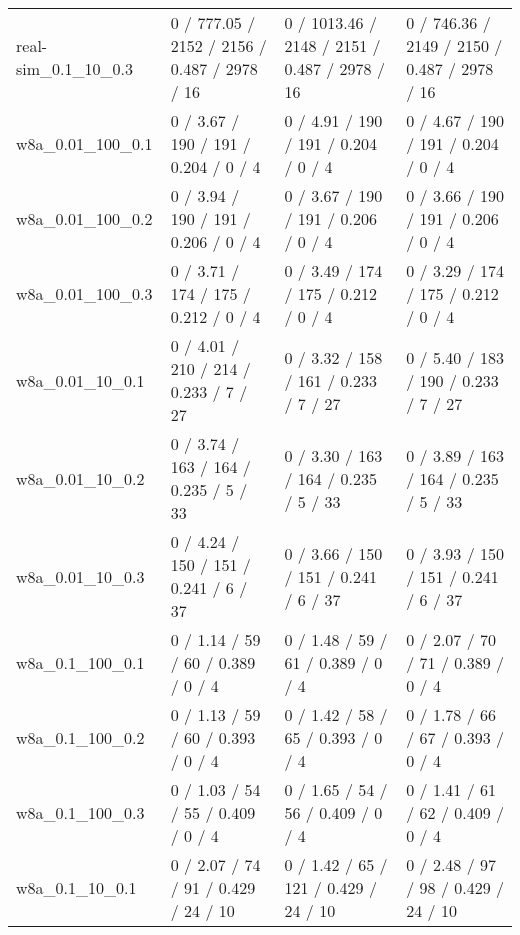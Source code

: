 \begin{tabular}{llll}
       real-sim\_0.1\_10\_0.3 &    0 / 777.05 /   2152 /    2156 / 0.487 /   2978 /     16 &   0 / 1013.46 /   2148 /    2151 / 0.487 /   2978 /     16 &    0 / 746.36 /   2149 /    2150 / 0.487 /   2978 /     16 \\
          w8a\_0.01\_100\_0.1 &      0 / 3.67 /    190 /     191 / 0.204 /      0 /      4 &      0 / 4.91 /    190 /     191 / 0.204 /      0 /      4 &      0 / 4.67 /    190 /     191 / 0.204 /      0 /      4 \\
          w8a\_0.01\_100\_0.2 &      0 / 3.94 /    190 /     191 / 0.206 /      0 /      4 &      0 / 3.67 /    190 /     191 / 0.206 /      0 /      4 &      0 / 3.66 /    190 /     191 / 0.206 /      0 /      4 \\
          w8a\_0.01\_100\_0.3 &      0 / 3.71 /    174 /     175 / 0.212 /      0 /      4 &      0 / 3.49 /    174 /     175 / 0.212 /      0 /      4 &      0 / 3.29 /    174 /     175 / 0.212 /      0 /      4 \\
           w8a\_0.01\_10\_0.1 &      0 / 4.01 /    210 /     214 / 0.233 /      7 /     27 &      0 / 3.32 /    158 /     161 / 0.233 /      7 /     27 &      0 / 5.40 /    183 /     190 / 0.233 /      7 /     27 \\
           w8a\_0.01\_10\_0.2 &      0 / 3.74 /    163 /     164 / 0.235 /      5 /     33 &      0 / 3.30 /    163 /     164 / 0.235 /      5 /     33 &      0 / 3.89 /    163 /     164 / 0.235 /      5 /     33 \\
           w8a\_0.01\_10\_0.3 &      0 / 4.24 /    150 /     151 / 0.241 /      6 /     37 &      0 / 3.66 /    150 /     151 / 0.241 /      6 /     37 &      0 / 3.93 /    150 /     151 / 0.241 /      6 /     37 \\
           w8a\_0.1\_100\_0.1 &      0 / 1.14 /     59 /      60 / 0.389 /      0 /      4 &      0 / 1.48 /     59 /      61 / 0.389 /      0 /      4 &      0 / 2.07 /     70 /      71 / 0.389 /      0 /      4 \\
           w8a\_0.1\_100\_0.2 &      0 / 1.13 /     59 /      60 / 0.393 /      0 /      4 &      0 / 1.42 /     58 /      65 / 0.393 /      0 /      4 &      0 / 1.78 /     66 /      67 / 0.393 /      0 /      4 \\
           w8a\_0.1\_100\_0.3 &      0 / 1.03 /     54 /      55 / 0.409 /      0 /      4 &      0 / 1.65 /     54 /      56 / 0.409 /      0 /      4 &      0 / 1.41 /     61 /      62 / 0.409 /      0 /      4 \\
            w8a\_0.1\_10\_0.1 &      0 / 2.07 /     74 /      91 / 0.429 /     24 /     10 &      0 / 1.42 /     65 /     121 / 0.429 /     24 /     10 &      0 / 2.48 /     97 /      98 / 0.429 /     24 /     10 \\

\end{tabular}
